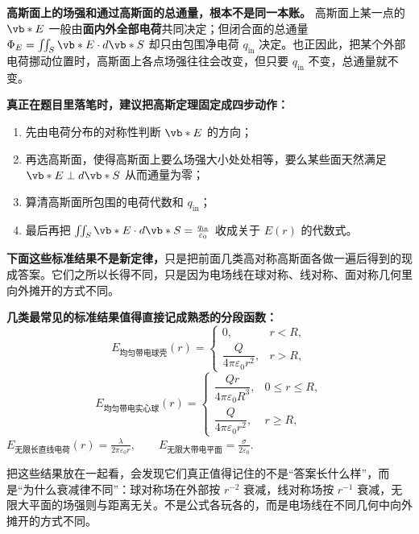 \documentclass[lang=cn,11pt]{elegantbook}
\newcommand{\bridge}[1]{\begin{note}#1\end{note}}
\begin{document}
\begin{remark}
\textbf{高斯面上的场强和通过高斯面的总通量，根本不是同一本账。} 高斯面上某一点的 \(\vb*{E}\) 一般由\textbf{面内外全部电荷}共同决定；但闭合面的总通量
 \(\Phi_E=\iint_S \vb*{E}\cdot d\vb*{S}\) 
却只由包围净电荷 \(q_{\mathrm{in}}\) 决定。也正因此，把某个外部电荷挪动位置时，高斯面上各点场强往往会改变，但只要 \(q_{\mathrm{in}}\) 不变，总通量就不变。
\end{remark}

\begin{note}
\textbf{真正在题目里落笔时，建议把高斯定理固定成四步动作：}
\begin{enumerate}
 \item 先由电荷分布的对称性判断 \(\vb*{E}\) 的方向；
 \item 再选高斯面，使得高斯面上要么场强大小处处相等，要么某些面天然满足 \(\vb*{E}\perp d\vb*{S}\) 从而通量为零；
 \item 算清高斯面所包围的电荷代数和 \(q_{\mathrm{in}}\)；
 \item 最后再把
 \(\iint_S \vb*{E}\cdot d\vb*{S}=\frac{q_{\mathrm{in}}}{\varepsilon_0}\) 
 收成关于 \(E(r)\) 的代数式。
\end{enumerate}
\end{note}

\begin{remark}
\textbf{下面这些标准结果不是新定律，}只是把前面几类高对称高斯面各做一遍后得到的现成答案。它们之所以长得不同，只是因为电场线在球对称、线对称、面对称几何里向外摊开的方式不同。
\par
\textbf{几类最常见的标准结果值得直接记成熟悉的分段函数：}
\[
E_{\text{均匀带电球壳}}(r)=
\begin{cases}
0, & r<R,\\[4pt]
\dfrac{Q}{4\pi\varepsilon_0 r^2}, & r>R,
\end{cases}
\]
\[
E_{\text{均匀带电实心球}}(r)=
\begin{cases}
\dfrac{Qr}{4\pi\varepsilon_0 R^3}, & 0\le r\le R,\\[4pt]
\dfrac{Q}{4\pi\varepsilon_0 r^2}, & r\ge R,
\end{cases}
\]
 \(E_{\text{无限长直线电荷}}(r)=\frac{\lambda}{2\pi\varepsilon_0 r}, \qquad E_{\text{无限大带电平面}}=\frac{\sigma}{2\varepsilon_0}.\) 
\end{remark}

\bridge{把这些结果放在一起看，会发现它们真正值得记住的不是“答案长什么样”，而是“为什么衰减律不同”：球对称场在外部按 \(r^{-2}\) 衰减，线对称场按 \(r^{-1}\) 衰减，无限大平面的场强则与距离无关。不是公式各玩各的，而是电场线在不同几何中向外摊开的方式不同。}
\end{document}

